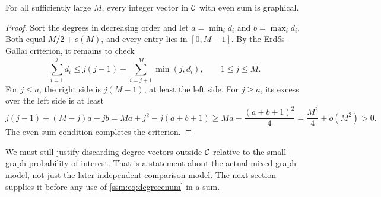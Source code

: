 \begin{lemma}\label{ssm:lem:graphical}
For all sufficiently large $M$, every integer vector in $\mathcal C$ with even sum is graphical.
\end{lemma}
\begin{proof}
Sort the degrees in decreasing order and let $a=\min_i d_i$ and $b=\max_i d_i$. Both equal $M/2+o(M)$, and every entry lies in $[0,M-1]$. By the Erd\H{o}s--Gallai criterion, it remains to check
\[
 \sum_{i=1}^j d_i\le j(j-1)+\sum_{i=j+1}^M\min(j,d_i),\qquad 1\le j\le M.
\]
For $j\le a$, the right side is $j(M-1)$, at least the left side. For $j\ge a$, its excess over the left side is at least
\[
 j(j-1)+(M-j)a-jb
 =Ma+j^2-j(a+b+1)
 \ge Ma-\frac{(a+b+1)^2}{4}
 =\frac{M^2}{4}+o(M^2)>0.
\]
The even-sum condition completes the criterion.
\end{proof}

We must still justify discarding degree vectors outside $\mathcal C$ relative to the small graph probability of interest. That is a statement about the actual mixed graph model, not just the later independent comparison model. The next section supplies it before any use of \eqref{ssm:eq:degreeenum} in a sum.
